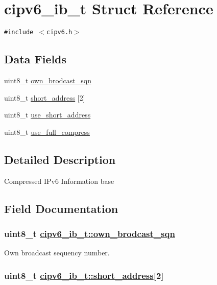 \hypertarget{structcipv6__ib__t}{
\section{cipv6\_\-ib\_\-t Struct Reference}
\label{structcipv6__ib__t}
}
{\tt \#include $<$cipv6.h$>$}

\subsection*{Data Fields}
\begin{CompactItemize}
\item 
uint8\_\-t \hyperlink{structcipv6__ib__t_19d4badda5774c04423a3412508254be}{own\_\-brodcast\_\-sqn}
\item 
uint8\_\-t \hyperlink{structcipv6__ib__t_92f71804a2b105eabf5908867212d1be}{short\_\-address} \mbox{[}2\mbox{]}
\item 
uint8\_\-t \hyperlink{structcipv6__ib__t_d05d62d4e95b0a7ea7a9ee993b506cde}{use\_\-short\_\-address}
\item 
uint8\_\-t \hyperlink{structcipv6__ib__t_f4b81848abaa43f3c7ae7ade198551d9}{use\_\-full\_\-compress}
\end{CompactItemize}


\subsection{Detailed Description}
Compressed IPv6 Information base 



\subsection{Field Documentation}
\hypertarget{structcipv6__ib__t_19d4badda5774c04423a3412508254be}{
\subsubsection[own\_\-brodcast\_\-sqn]{\setlength{\rightskip}{0pt plus 5cm}uint8\_\-t \hyperlink{structcipv6__ib__t_19d4badda5774c04423a3412508254be}{cipv6\_\-ib\_\-t::own\_\-brodcast\_\-sqn}}}
\label{structcipv6__ib__t_19d4badda5774c04423a3412508254be}


Own broadcast sequency number. \hypertarget{structcipv6__ib__t_92f71804a2b105eabf5908867212d1be}{
\subsubsection[short\_\-address]{\setlength{\rightskip}{0pt plus 5cm}uint8\_\-t \hyperlink{structcipv6__ib__t_92f71804a2b105eabf5908867212d1be}{cipv6\_\-ib\_\-t::short\_\-address}\mbox{[}2\mbox{]}}}
\label{structcipv6__ib__t_92f71804a2b105eabf5908867212d1be}


